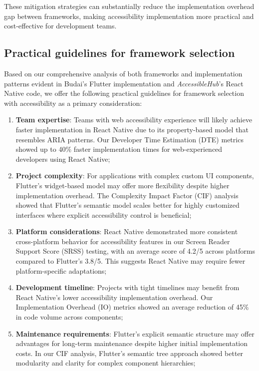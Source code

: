 These mitigation strategies can substantially reduce the implementation overhead gap between frameworks, making accessibility implementation more practical and cost-effective for development teams.

\subsection{Practical guidelines for framework selection}
\label{subsec:framework-selection}

Based on our comprehensive analysis of both frameworks and implementation patterns evident in Budai's Flutter implementation and \textit{AccessibleHub}'s React Native code, we offer the following practical guidelines for framework selection with accessibility as a primary consideration:

\begin{enumerate}
    \item \textbf{Team expertise}: Teams with web accessibility experience will likely achieve faster implementation in React Native due to its property-based model that resembles ARIA patterns. Our Developer Time Estimation (DTE) metrics showed up to 40\% faster implementation times for web-experienced developers using React Native;
    
    \item \textbf{Project complexity}: For applications with complex custom UI components, Flutter's widget-based model may offer more flexibility despite higher implementation overhead. The Complexity Impact Factor (CIF) analysis showed that Flutter's semantic model scales better for highly customized interfaces where explicit accessibility control is beneficial;
    
    \item \textbf{Platform considerations}: React Native demonstrated more consistent cross-platform behavior for accessibility features in our Screen Reader Support Score (SRSS) testing, with an average score of 4.2/5 across platforms compared to Flutter's 3.8/5. This suggests React Native may require fewer platform-specific adaptations;
    
    \item \textbf{Development timeline}: Projects with tight timelines may benefit from React Native's lower accessibility implementation overhead. Our Implementation Overhead (IO) metrics showed an average reduction of 45\% in code volume across components;
    
    \item \textbf{Maintenance requirements}: Flutter's explicit semantic structure may offer advantages for long-term maintenance despite higher initial implementation costs. In our CIF analysis, Flutter's semantic tree approach showed better modularity and clarity for complex component hierarchies;
    

\end{enumerate}
